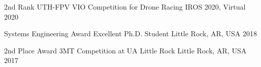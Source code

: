 



\begin{cvhonors}

\cvhonor
{2nd Rank} %
{UTH-FPV VIO Competition for Drone Racing} %
{IROS 2020, Virtual} %
{2020} %

\cvhonor
	{Systems Engineering Award} %
	{Excellent Ph.D. Student} %
	{Little Rock, AR, USA} %
	{2018} %

  \cvhonor
	{2nd Place Award} %
	{3MT Competition at UA Little Rock} %
	{Little Rock, AR, USA} %
	{2017} %


%
%

\end{cvhonors}


